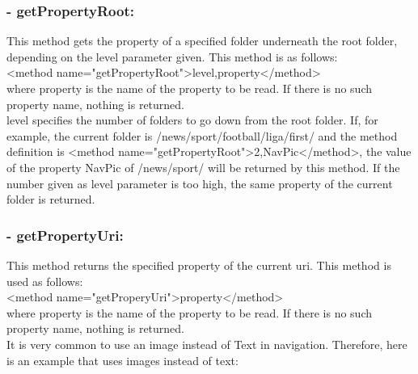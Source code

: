 \subsubsection{- getPropertyRoot:} 

  This method gets the property of a specified folder underneath the root folder, depending 
on the level parameter given. This method is as follows:\\
{\tag <method name="getPropertyRoot">level,property</method>} \\
where {\name property} is the name of the property to be read. If there is no such property 
name, nothing is returned.\\
{\name level} specifies the number of folders to go down from the root folder. If, for 
example, the current folder is {\dir /news/sport/foot\-ball/li\-ga/first/} and the method 
definition is {\tag <method name="get\-Property\-Root">2,NavPic</me\-thod>}, the value of 
the property {\name NavPic} of {\dir /news/sport/} will be returned by this 
method. If the number given as level parameter is too high, the same property of the 
current folder is returned. \\


\subsubsection{- getPropertyUri:} 

  This method returns the specified property of the current uri. This method is used as follows:\\
{\tag <method name="getProperyUri">property</method>} \\
where {\name property} is the name of the property to be read. If there is no such property 
name, nothing is returned. \\


It is very common to use an image instead of Text in navigation. Therefore, here is 
an example that uses images instead of text: \\

